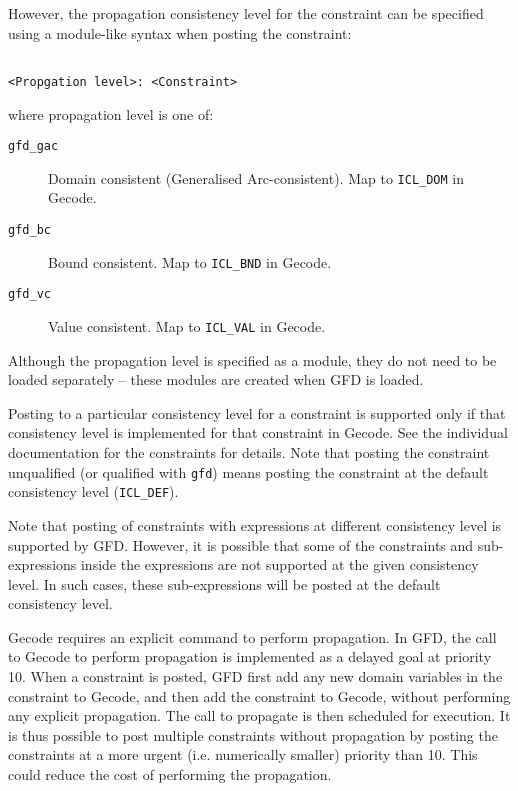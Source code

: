 However, the propagation consistency level for the constraint can be 
specified using a module-like syntax when posting the constraint:

\begin{verbatim}

<Propgation level>: <Constraint>

\end{verbatim}

where propagation level is one of:

\begin{description}
\item[{\tt gfd_gac}] Domain consistent (Generalised Arc-consistent). Map to {\tt ICL_DOM} in Gecode.
\item[{\tt gfd_bc}] Bound consistent. Map to {\tt ICL_BND} in Gecode.
\item[{\tt gfd_vc}] Value consistent. Map to {\tt ICL_VAL} in Gecode.
\end{description}

Although the propagation level is specified as a module, they do not need to
be loaded separately -- these modules are created when GFD is loaded.

Posting to a particular consistency level for a constraint is supported only
if that consistency level is implemented for that constraint
in Gecode. See the individual documentation for the constraints for details.
Note that posting the constraint unqualified (or qualified with {\tt gfd}) 
means posting the constraint at the default consistency level ({\tt ICL_DEF}). 

Note that posting of constraints with expressions at different 
consistency level is supported by GFD. However, it is possible that some of
the constraints and sub-expressions inside the expressions are not supported
at the given consistency level. In such cases, these sub-expressions will be
posted at the default consistency level.

Gecode requires an explicit command to perform propagation. In GFD,
the call to Gecode to perform propagation is implemented as a delayed
 goal at priority 10.
When a constraint is posted, GFD first add any new domain variables in
 the constraint to Gecode, and then add the constraint to Gecode,
 without performing any explicit propagation. The call to propagate is
then scheduled for execution. It is thus possible to post multiple
 constraints without propagation by posting the constraints at a more
urgent (i.e. numerically smaller) priority than 10. This could reduce
 the cost of performing the propagation.
 
